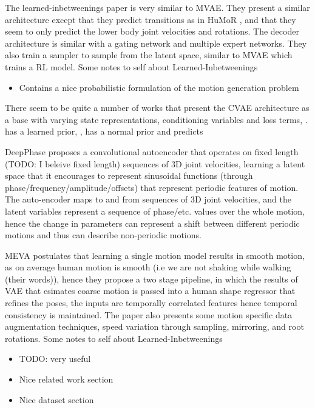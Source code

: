 The learned-inbetweenings \cite{learnedInbetweening} paper is very similar to MVAE. They present a similar architecture except that they predict transitions as in HuMoR \cite{humor}, and that they seem to only predict the lower body joint velocities and rotations. The decoder architecture is similar with a gating network and multiple expert networks. They also train a sampler to sample from the latent space, similar to MVAE which trains a RL model.
Some notes to self about Learned-Inbetweenings
\begin{itemize}
    \item Contains a nice probabilistic formulation of the motion generation problem
\end{itemize}


There seem to be quite a number of works that present the CVAE architecture as a base with varying state representations, conditioning variables and loss terms, \cite{humor, learnedInbetweening, MVAE,structured4Dlatentspace}. \cite{humor} has a learned prior, , \cite{learnedInbetweening} has a normal prior and predicts


DeepPhase \cite{DeepPhase} proposes a convolutional autoencoder that operates on fixed length (TODO: I beleive fixed length) sequences of 3D joint velocities, learning a latent space that it encourages to represent sinusoidal functions (through phase/frequency/amplitude/offsets) that represent periodic features of motion. The auto-encoder maps to and from sequences of 3D joint velocities, and the latent variables represent a sequence of phase/etc. values over the whole motion, hence the change in parameters can represent a shift between different periodic motions and thus can describe non-periodic motions.


MEVA \cite{MEVA} postulates that learning a single motion model results in smooth motion, as on average human motion is smooth (i.e we are not shaking while walking (their words)), hence they propose a two stage pipeline, in which the results of VAE that esimates coarse motion is passed into a human shape regressor that refines the poses, the inputs are temporally correlated features hence temporal consistency is maintained. The paper also presents some motion specific data augmentation techniques, speed variation through sampling, mirroring, and root rotations. 
Some notes to self about Learned-Inbetweenings
\begin{itemize}
    \item TODO: very useful
    \item Nice related work section
    \item Nice dataset section
\end{itemize}


